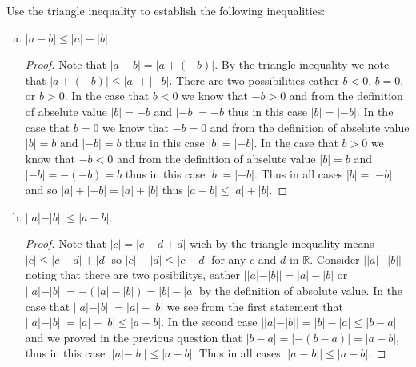 \documentclass[12pt]{article}
\makeatletter
\theoremstyle{homework}
\newenvironment{exercise}[1]
{\def\@currentlabel{#1}\exercisecore}
{\endexercisecore}
\makeatother
\begin{document}
\begin{exercise}{1.2.5}
Use the triangle inequality to establish the following inequalities:
\end{exercise}
\begin{enumerate}[(a)]
\item $|a-b| \le |a| + |b|$.
\begin{proof}
Note that $|a-b|=|a+(-b)|$.  By the triangle inequality we note that $|a+(-b)| \le |a|+|-b|$.  There are two possibilities eather $b< 0$, $b=0$, or $b> 0$.  In the case that $b< 0$ we know that $-b>0$ and from the definition of abselute value $|b|=-b$ and $|-b|=-b$ thus in this case $|b|=|-b|$.  In the case that $b= 0$ we know that $-b=0$ and from the definition of abselute value $|b|=b$ and $|-b|=b$ thus in this case $|b|=|-b|$.  In the case that $b> 0$ we know that $-b<0$ and from the definition of abselute value $|b|=b$ and $|-b|=-(-b)=b$ thus in this case $|b|=|-b|$.  Thus in all cases $|b|=|-b|$ and so $|a|+|-b|=|a|+|b|$ thus $|a-b|\le |a|+|b|$.
\end{proof}
\item $||a|-|b|| \le |a-b|$.
\begin{proof}
Note that $|c|=|c-d+d|$ wich by the triangle inequality means $|c|\le |c-d|+|d|$ so $|c|-|d|\le |c-d|$ for any $c$ and $d$ in $\mathbb{R}$.  Consider $||a|-|b||$ noting that there are two posibilitys, eather $||a|-|b||=|a|-|b|$ or $||a|-|b||=-(|a|-|b|)=|b|-|a|$ by the definition of absolute value.  In the case that $||a|-|b||=|a|-|b|$ we see from the first statement that $||a|-|b||=|a|-|b| \le |a-b|$.  In the second case $||a|-|b||=|b|-|a|\le |b-a|$ and we proved in the previous question that $|b-a|=|-(b-a)|=|a-b|$, thus in this case $||a|-|b||\le |a-b|$.  Thus in all cases $||a|-|b||\le |a-b|$.
\end{proof}
\end{enumerate}
\end{document}
